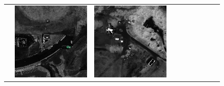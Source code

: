 \begin{figure}[h!]
\begin{tabularx}{\textwidth}{c|*{9}{X}}
    & \includegraphics[trim={440pt 360pt 460pt 555pt},clip,width=\linewidth]{images/015Results/03ablation/comp_images/ndvi/427.png}
    & \includegraphics[trim={740pt 420pt 180pt 510pt},clip,width=\linewidth]{images/015Results/03ablation/comp_images/ndvi/523.png}

\end{tabularx}
\end{figure}
